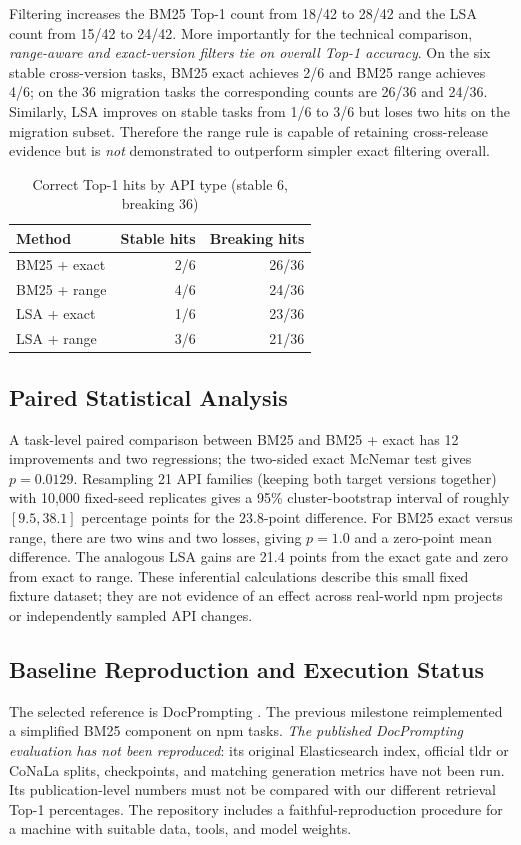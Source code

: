 \documentclass[conference]{IEEEtran}
\begin{document}
Filtering increases the BM25 Top-1 count from 18/42 to 28/42 and the LSA count from 15/42 to 24/42. More importantly for the technical comparison, \emph{range-aware and exact-version filters tie on overall Top-1 accuracy}. On the six stable cross-version tasks, BM25 exact achieves 2/6 and BM25 range achieves 4/6; on the 36 migration tasks the corresponding counts are 26/36 and 24/36. Similarly, LSA improves on stable tasks from 1/6 to 3/6 but loses two hits on the migration subset. Therefore the range rule is capable of retaining cross-release evidence but is \emph{not} demonstrated to outperform simpler exact filtering overall.


\begin{table}[t]
\centering
\caption{Correct Top-1 hits by API type (stable 6, breaking 36)}
\label{tab:subgroups}
\setlength{\tabcolsep}{4pt}
\begin{tabular}{lrr}
\toprule
Method & Stable hits & Breaking hits\\
\midrule
BM25 + exact & 2/6 & 26/36\\
BM25 + range & 4/6 & 24/36\\
LSA + exact & 1/6 & 23/36\\
LSA + range & 3/6 & 21/36\\
\bottomrule
\end{tabular}
\end{table}

\subsection{Paired Statistical Analysis}
A task-level paired comparison between BM25 and BM25 + exact has 12 improvements and two regressions; the two-sided exact McNemar test gives $p=0.0129$. Resampling 21 API families (keeping both target versions together) with 10,000 fixed-seed replicates gives a 95\% cluster-bootstrap interval of roughly $[9.5,38.1]$ percentage points for the $23.8$-point difference. For BM25 exact versus range, there are two wins and two losses, giving $p=1.0$ and a zero-point mean difference. The analogous LSA gains are 21.4 points from the exact gate and zero from exact to range. These inferential calculations describe this small fixed fixture dataset; they are not evidence of an effect across real-world npm projects or independently sampled API changes.

\subsection{Baseline Reproduction and Execution Status}
The selected reference is DocPrompting \cite{docprompting}. The previous milestone reimplemented a simplified BM25 component on npm tasks. \emph{The published DocPrompting evaluation has not been reproduced}: its original Elasticsearch index, official tldr or CoNaLa splits, checkpoints, and matching generation metrics have not been run. Its publication-level numbers must not be compared with our different retrieval Top-1 percentages. The repository includes a faithful-reproduction procedure for a machine with suitable data, tools, and model weights.
\end{document}
